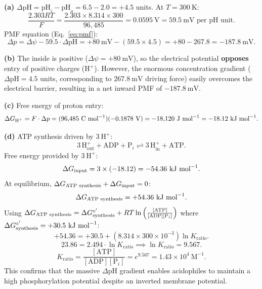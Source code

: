 \documentclass[12pt, a4paper, oneside]{report}
\begin{document}
\begin{solution}
  \textbf{(a)} $\Delta\mathrm{pH} = \text{pH}_i - \text{pH}_o = 6.5 - 2.0 = +4.5$ units.
  At $T = 300~\text{K}$:
  \[
    \frac{2.303 R T}{F} = \frac{2.303 \times 8.314 \times 300}{96{,}485} = 0.0595~\text{V} = 59.5~\text{mV per pH unit}.
  \]
  PMF equation (Eq.~\ref{eq:pmf}):
  \[
    \Delta p = \Delta\psi - 59.5 \cdot \Delta\mathrm{pH} = +80~\text{mV} - (59.5 \times 4.5) = +80 - 267.8 = -187.8~\text{mV}.
  \]

  \textbf{(b)} The inside is positive ($\Delta\psi = +80~\text{mV}$), so the electrical potential \textbf{opposes} entry of positive charges ($\mathrm{H}^+$). However, the enormous concentration gradient ($\Delta\mathrm{pH} = 4.5$ units, corresponding to $267.8~\text{mV}$ driving force) easily overcomes the electrical barrier, resulting in a net inward PMF of $-187.8~\text{mV}$.

  \textbf{(c)} Free energy of proton entry:
  \[
    \Delta G_{\text{H}^+} = F \cdot \Delta p = (96{,}485~\text{C~mol}^{-1})(-0.1878~\text{V}) = -18{,}120~\text{J~mol}^{-1} = -18.12~\text{kJ~mol}^{-1}.
  \]

  \textbf{(d)} ATP synthesis driven by $3~\text{H}^+$:
  \[
    3\,\mathrm{H}^+_{\text{out}} + \text{ADP} + \mathrm{P}_i \rightleftharpoons 3\,\mathrm{H}^+_{\text{in}} + \text{ATP}.
  \]
  Free energy provided by $3~\text{H}^+$:
  \[
    \Delta G_{\text{input}} = 3 \times (-18.12) = -54.36~\text{kJ~mol}^{-1}.
  \]
  At equilibrium, $\Delta G_{\text{ATP synthesis}} + \Delta G_{\text{input}} = 0$:
  \[
    \Delta G_{\text{ATP synthesis}} = +54.36~\text{kJ~mol}^{-1}.
  \]
  Using $\Delta G_{\text{ATP synthesis}} = \Delta G^{\circ'}_{\text{synthesis}} + RT \ln\left(\frac{[\text{ATP}]}{[\text{ADP}][\mathrm{P}_i]}\right)$ where $\Delta G^{\circ'}_{\text{synthesis}} = +30.5~\text{kJ~mol}^{-1}$:
  \[
    +54.36 = +30.5 + (8.314 \times 300 \times 10^{-3}) \ln K_{\text{ratio}}.
  \]
  \[
    23.86 = 2.494 \cdot \ln K_{\text{ratio}} \implies \ln K_{\text{ratio}} = 9.567.
  \]
  \[
    K_{\text{ratio}} = \frac{[\text{ATP}]}{[\text{ADP}][\mathrm{P}_i]} = e^{9.567} = 1.43 \times 10^4~\text{M}^{-1}.
  \]
  This confirms that the massive $\Delta\mathrm{pH}$ gradient enables acidophiles to maintain a high phosphorylation potential despite an inverted membrane potential.
\end{solution}

\end{document}
